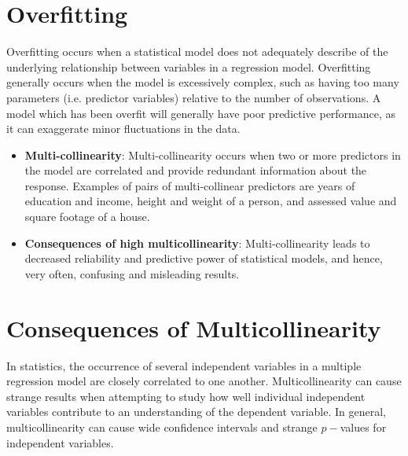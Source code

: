 \documentclass[a4paper,12pt]{article}
\begin{document}
	
	\section{Overfitting}
	Overfitting occurs when a statistical model does not adequately describe of the underlying relationship between variables in a regression model. Overfitting generally occurs when the model is excessively complex, such as having too many parameters (i.e. predictor variables) relative to the number of observations. A model which has been overfit will generally have poor predictive performance, as it can exaggerate minor fluctuations in the data.
	
\begin{itemize}
	\item \textbf{Multi-collinearity}: Multi-collinearity occurs when two or more predictors in the model are
	correlated and provide redundant information about the response. Examples of pairs of multi-collinear predictors are years of education and income, height and weight of a person, and assessed value and square footage
	of a house.
	
	\item \textbf{Consequences of high multicollinearity}:
	Multi-collinearity leads to decreased reliability and predictive power of statistical models, and hence, very often, confusing and misleading results.
\end{itemize}
\section{Consequences of Multicollinearity}

In statistics, the occurrence of several independent variables in a multiple regression model are closely correlated to one another. 
Multicollinearity can cause strange results when attempting to study how well individual independent variables contribute to an understanding of the dependent variable. 
In general, multicollinearity can cause wide confidence intervals and strange $p-$values for independent variables.
\end{document}
